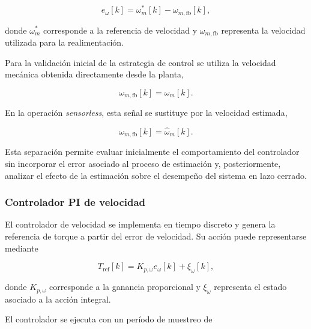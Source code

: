 \begin{equation}
e_{\omega}[k]
=
\omega_m^{*}[k]
-
\omega_{m,\mathrm{fb}}[k],
\label{eq:error_velocidad}
\end{equation}

donde $\omega_m^{*}$ corresponde a la referencia de velocidad y
$\omega_{m,\mathrm{fb}}$ representa la velocidad utilizada para la
realimentación.

Para la validación inicial de la estrategia de control se utiliza la
velocidad mecánica obtenida directamente desde la planta,

\begin{equation}
\omega_{m,\mathrm{fb}}[k]
=
\omega_m[k].
\label{eq:velocidad_feedback_real}
\end{equation}

En la operación \textit{sensorless}, esta señal se sustituye por la
velocidad estimada,

\begin{equation}
\omega_{m,\mathrm{fb}}[k]
=
\hat{\omega}_m[k].
\label{eq:velocidad_feedback_estimada}
\end{equation}

Esta separación permite evaluar inicialmente el comportamiento del
controlador sin incorporar el error asociado al proceso de estimación
y, posteriormente, analizar el efecto de la estimación sobre el
desempeño del sistema en lazo cerrado.


\subsubsection{Controlador PI de velocidad}
\label{subsubsec:pi_velocidad}

El controlador de velocidad se implementa en tiempo discreto y genera
la referencia de torque a partir del error de velocidad. Su acción
puede representarse mediante

\begin{equation}
T_{\mathrm{ref}}[k]
=
K_{p,\omega}e_{\omega}[k]
+
\xi_{\omega}[k],
\label{eq:pi_velocidad_discreto}
\end{equation}

donde $K_{p,\omega}$ corresponde a la ganancia proporcional y
$\xi_{\omega}$ representa el estado asociado a la acción integral.

El controlador se ejecuta con un período de muestreo de

